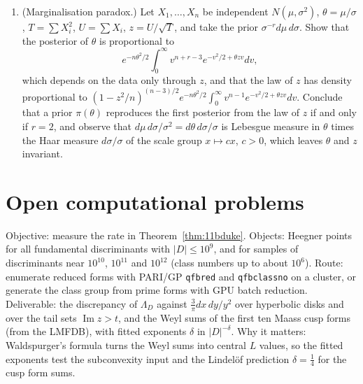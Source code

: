 \begin{enumerate}
\item\label{ex:11bparadox} (Marginalisation paradox.) Let $X_1,\dots,X_n$ be independent $N(\mu,\sigma^2)$, $\theta=\mu/\sigma$, $T=\sum X_i^2$, $U=\sum X_i$, $z=U/\sqrt T$, and take the prior $\sigma^{-r}d\mu\,d\sigma$. Show that the posterior of $\theta$ is proportional to
\[e^{-n\theta^2/2}\int_0^\infty v^{n+r-3}e^{-v^2/2+\theta zv}dv,\]
which depends on the data only through $z$, and that the law of $z$ has density proportional to $(1-z^2/n)^{(n-3)/2}e^{-n\theta^2/2}\int_0^\infty v^{n-1}e^{-v^2/2+\theta zv}dv$. Conclude that a prior $\pi(\theta)$ reproduces the first posterior from the law of $z$ if and only if $r=2$, and observe that $d\mu\,d\sigma/\sigma^2=d\theta\,d\sigma/\sigma$ is Lebesgue measure in $\theta$ times the Haar measure $d\sigma/\sigma$ of the scale group $x\mapsto cx$, $c>0$, which leaves $\theta$ and $z$ invariant.
\end{enumerate}

\section{Open computational problems}

\begin{compproblem}\label{cp:11bduke}
Objective: measure the rate in Theorem~\ref{thm:11bduke}. Objects: Heegner points for all fundamental discriminants with $|D|\le10^9$, and for samples of discriminants near $10^{10}$, $10^{11}$ and $10^{12}$ (class numbers up to about $10^6$). Route: enumerate reduced forms with PARI/GP \texttt{qfbred} and \texttt{qfbclassno} on a cluster, or generate the class group from prime forms with GPU batch reduction. Deliverable: the discrepancy of $\Lambda_D$ against $\frac3\pi dx\,dy/y^2$ over hyperbolic disks and over the tail sets $\operatorname{Im}z>t$, and the Weyl sums of the first ten Maass cusp forms (from the LMFDB), with fitted exponents $\delta$ in $|D|^{-\delta}$. Why it matters: Waldspurger's formula turns the Weyl sums into central $L$ values, so the fitted exponents test the subconvexity input and the Lindel\"of prediction $\delta=\frac14$ for the cusp form sums.
\end{compproblem}

